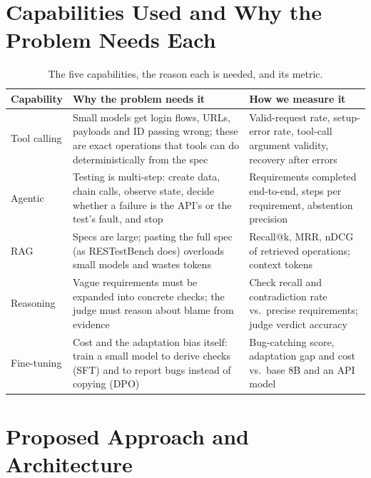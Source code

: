 \documentclass[11pt,a4paper]{article}
\begin{document}
\section{Capabilities Used and Why the Problem Needs Each}
\begin{table}[H]
\centering\small
\begin{tabularx}{\linewidth}{@{}P{2.3cm}LL@{}}
\toprule
\textbf{Capability} & \textbf{Why the problem needs it} & \textbf{How we measure it}\\
\midrule
Tool calling & Small models get login flows, URLs, payloads and ID passing wrong; these are exact operations that tools can do deterministically from the spec & Valid-request rate, setup-error rate, tool-call argument validity, recovery after errors\\
Agentic & Testing is multi-step: create data, chain calls, observe state, decide whether a failure is the API's or the test's fault, and stop & Requirements completed end-to-end, steps per requirement, abstention precision\\
RAG & Specs are large; pasting the full spec (as RESTestBench does) overloads small models and wastes tokens & Recall@k, MRR, nDCG of retrieved operations; context tokens\\
Reasoning & Vague requirements must be expanded into concrete checks; the judge must reason about blame from evidence & Check recall and contradiction rate vs.\ precise requirements; judge verdict accuracy\\
Fine-tuning & Cost and the adaptation bias itself: train a small model to derive checks (SFT) and to report bugs instead of copying (DPO) & Bug-catching score, adaptation gap and cost vs.\ base 8B and an API model\\
\bottomrule
\end{tabularx}
\caption{The five capabilities, the reason each is needed, and its metric.}
\end{table}

\section{Proposed Approach and Architecture}
\end{document}
